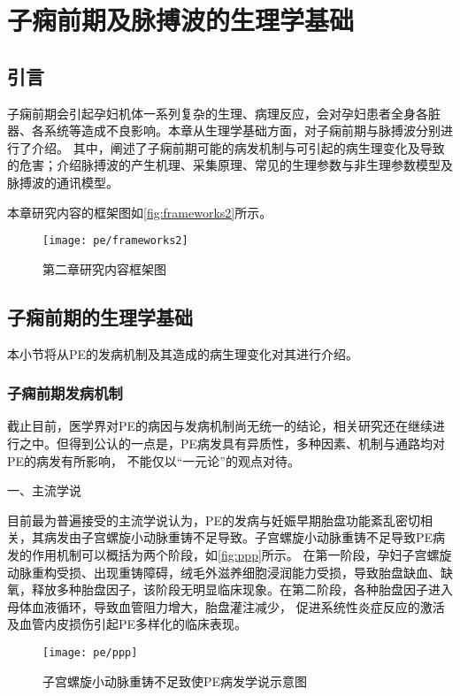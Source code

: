 \chapter{子痫前期及脉搏波的生理学基础}
\section{引言}
子痫前期会引起孕妇机体一系列复杂的生理、病理反应，会对孕妇患者全身各脏器、各系统等造成不良影响。本章从生理学基础方面，对子痫前期与脉搏波分别进行了介绍。
其中，阐述了子痫前期可能的病发机制与可引起的病生理变化及导致的危害；介绍脉搏波的产生机理、采集原理、常见的生理参数与非生理参数模型及脉搏波的通讯模型。

本章研究内容的框架图如\autoref{fig:frameworks2}所示。
\begin{figure}[htbp]
    \centering
    \texttt{[image: pe/frameworks2]} 
    \caption{\label{fig:frameworks2}第二章研究内容框架图}
\end{figure}

\section{子痫前期的生理学基础}
本小节将从PE的发病机制及其造成的病生理变化对其进行介绍。

\subsection{子痫前期发病机制}
截止目前，医学界对PE的病因与发病机制尚无统一的结论，相关研究还在继续进行之中。但得到公认的一点是，PE病发具有异质性，多种因素、机制与通路均对PE的病发有所影响，
不能仅以“一元论”的观点对待。

一、主流学说

目前最为普遍接受的主流学说认为，PE的发病与妊娠早期胎盘功能紊乱密切相关，其病发由子宫螺旋小动脉重铸不足导致\cite{OAG9,Duvekot2010,Ix2009}。子宫螺旋小动脉重铸不足导致PE病发的作用机制可以概括为两个阶段，如\autoref{fig:ppp}所示。
在第一阶段，孕妇子宫螺旋动脉重构受损、出现重铸障碍，绒毛外滋养细胞浸润能力受损，导致胎盘缺血、缺氧，释放多种胎盘因子，该阶段无明显临床现象。在第二阶段，各种胎盘因子进入母体血液循环，导致血管阻力增大，胎盘灌注减少，
促进系统性炎症反应的激活及血管内皮损伤引起PE多样化的临床表现。
\begin{figure}[htbp]
    \centering
    \texttt{[image: pe/ppp]}
    \caption[子宫螺旋小动脉重铸不足致使PE病发学说示意图]{\label{fig:ppp}子宫螺旋小动脉重铸不足致使PE病发学说示意图\cite{Duvekot2010,Ix2009}}
\end{figure}


